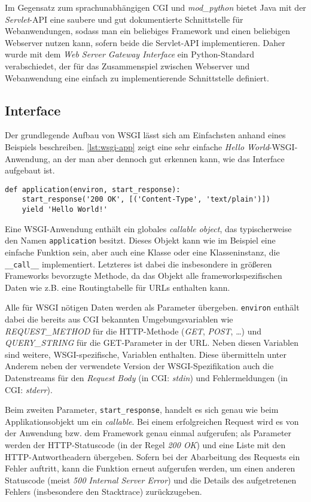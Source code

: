 Im Gegensatz zum sprachunabhängigen CGI und \emph{mod\_python} bietet Java mit der \emph{Servlet}-API
eine saubere und gut dokumentierte Schnittstelle für Webanwendungen, sodass man ein beliebiges
Framework und einen beliebigen Webserver nutzen kann, sofern beide die Servlet-API implementieren.
Daher wurde mit dem \emph{Web Server Gateway Interface} ein Python-Standard verabschiedet, der für
das Zusammenspiel zwischen Webserver und Webanwendung eine einfach zu implementierende Schnittstelle
definiert.


\subsection{Interface}\label{wsgi-interface}

Der grundlegende Aufbau von WSGI lässt sich am Einfachsten anhand eines Beispiels beschreiben.
\autoref{lst:wsgi-app} zeigt eine sehr einfache \emph{Hello World}-WSGI-Anwendung, an der man aber
dennoch gut erkennen kann, wie das Interface aufgebaut ist.

\begin{lstlisting}[caption=Einfache WSGI-Applikation,label=lst:wsgi-app]
def application(environ, start_response):
    start_response('200 OK', [('Content-Type', 'text/plain')])
    yield 'Hello World!'
\end{lstlisting}

Eine WSGI-Anwendung enthält ein globales \emph{callable object}, das typischerweise den Namen
\lstinline{application} besitzt. Dieses Objekt kann wie im Beispiel eine einfache Funktion sein,
aber auch eine Klasse oder eine Klasseninstanz, die \lstinline{__call__} implementiert. Letzteres
ist dabei die insbesondere in größeren Frameworks bevorzugte Methode, da das Objekt alle
frameworkspezifischen Daten wie z.B. eine Routingtabelle für URLs enthalten kann.

Alle für WSGI nötigen Daten werden als Parameter übergeben. \lstinline{environ} enthält dabei die
bereits aus CGI bekannten Umgebungsvariablen wie \emph{REQUEST\_METHOD} für die HTTP-Methode
(\emph{GET}, \emph{POST}, \ldots) und \emph{QUERY\_STRING} für die GET-Parameter in der URL. Neben
diesen Variablen sind weitere, WSGI-spezifische, Variablen enthalten. Diese übermitteln unter
Anderem neben der verwendete Version der WSGI-Spezifikation auch die Datenstreams für den
\emph{Request Body} (in CGI: \emph{stdin}) und Fehlermeldungen (in CGI: \emph{stderr}).

Beim zweiten Parameter, \lstinline{start_response}, handelt es sich genau wie beim
Applikationsobjekt um ein \emph{callable}. Bei einem erfolgreichen Request wird es von der Anwendung
bzw. dem Framework genau einmal aufgerufen; als Parameter werden der HTTP-Statuscode (in der
Regel \emph{200 OK}) und eine Liste mit den HTTP-Antwortheadern übergeben. Sofern bei der
Abarbeitung des Requests ein Fehler auftritt, kann die Funktion erneut aufgerufen werden, um einen
anderen Statuscode (meist \emph{500 Internal Server Error}) und die Details des aufgetretenen
Fehlers (insbesondere den Stacktrace) zurückzugeben.

